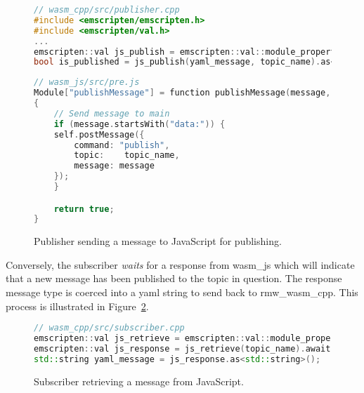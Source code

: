         \begin{figure}[htbp]
            \centering
            \begin{lstlisting}[language=C++]
// wasm_cpp/src/publisher.cpp
#include <emscripten/emscripten.h>
#include <emscripten/val.h>
...
emscripten::val js_publish = emscripten::val::module_property("publishMessage");
bool is_published = js_publish(yaml_message, topic_name).as<bool>();
\end{lstlisting}

            \begin{lstlisting}[language=C++] 
// wasm_js/src/pre.js
Module["publishMessage"] = function publishMessage(message, topic_name)
{
    // Send message to main
    if (message.startsWith("data:")) {
    self.postMessage({
        command: "publish",
        topic:    topic_name,
        message: message
    });
    }

    return true;
}
\end{lstlisting}
            \caption{Publisher sending a message to JavaScript for publishing.}
            \label{fig:publish}
        \end{figure}

    Conversely, the subscriber \textit{waits} for a response from \textsf{wasm\_js} which will indicate that a new message has been published to the topic in question. The response message type is coerced into a yaml string to send back to \textsf{rmw\_wasm\_cpp}. This process is illustrated in Figure~\ref{fig:retrieve}.

    \begin{figure}[htbp]
        \centering
        \begin{lstlisting}[language=C++]
// wasm_cpp/src/subscriber.cpp
emscripten::val js_retrieve = emscripten::val::module_property("retrieveMessage");
emscripten::val js_response = js_retrieve(topic_name).await();
std::string yaml_message = js_response.as<std::string>();
\end{lstlisting}    
        \caption{Subscriber retrieving a message from JavaScript.}
        \label{fig:retrieve}
    \end{figure}

